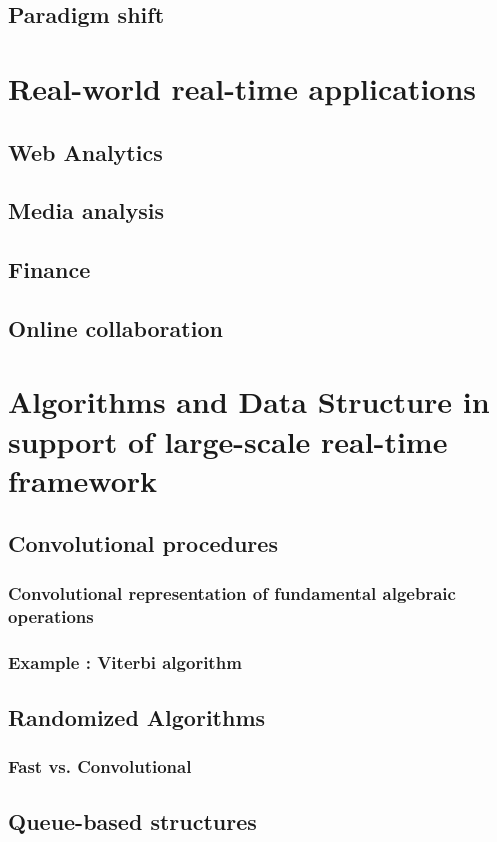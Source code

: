 \documentclass[]{book}    %
\begin{document}
\section{Paradigm shift}

\chapter{Real-world real-time applications}
\section{Web Analytics}
\section{Media analysis}
\section{Finance}
\section{Online collaboration}

\chapter{Algorithms and Data Structure in support of large-scale real-time framework}
\section{Convolutional procedures}
\subsection{Convolutional representation of fundamental algebraic operations}
\subsection{Example : Viterbi algorithm}
\section{Randomized Algorithms}
\subsection{Fast vs. Convolutional}
\section{Queue-based structures}
\end{document}
